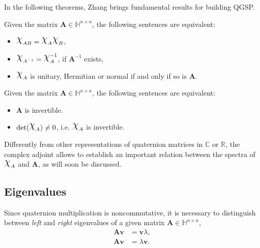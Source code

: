 In the following theorems, Zhang brings fundamental results for building QGSP.

\begin{theorem}
\label{th:equiv01}
Given the matrix $ \mathbf{A} \in \mathbb{H}^{n \times n} $, the following sentences are equivalent:

\begin{itemize}[noitemsep]
\item $ \rchi_{AB} = \rchi_{A} \rchi_{B} $,
\item $ \rchi_{A^{-1}} = \rchi_{A}^{-1}$, if $ \mathbf{A}^{-1} $ exists,
\item $ \rchi_{A}$ is unitary, Hermitian or normal if and only if so is $ \mathbf{A} $.
\end{itemize}

\end{theorem}

\begin{theorem}
\label{th:equiv02}
Given the matrix $ \mathbf{A} \in \mathbb{H}^{n \times n} $, the following sentences are equivalent:

\begin{itemize}[noitemsep]
\item $\mathbf{A}$ is invertible.
\item $\mathrm{det}(\rchi_A) \neq 0$, i.e. $\rchi_{A}$ is invertible.
\end{itemize}

\end{theorem}

Differently from other representations of quaternion matrices in $ \mathbb{C} $ or $ \mathbb{R} $, the complex adjoint allows to establish an important relation between the spectra of $ \rchi_{A} $ and $ \mathbf{A} $, as will soon be discussed.

\subsection{Eigenvalues}
Since quaternion multiplication is noncommutative, it is necessary to distinguish between \textit{left} and \textit{right} eigenvalues of a given matrix $ \mathbf{A} \in \mathbb{H}^{n \times n} $,
\begin{align*}
\mathbf{A} \mathbf{v} &= \mathbf{v} \lambda, \tag{right} \\
\mathbf{A} \mathbf{v} &= \lambda \mathbf{v}.  \tag{left}
\end{align*}

